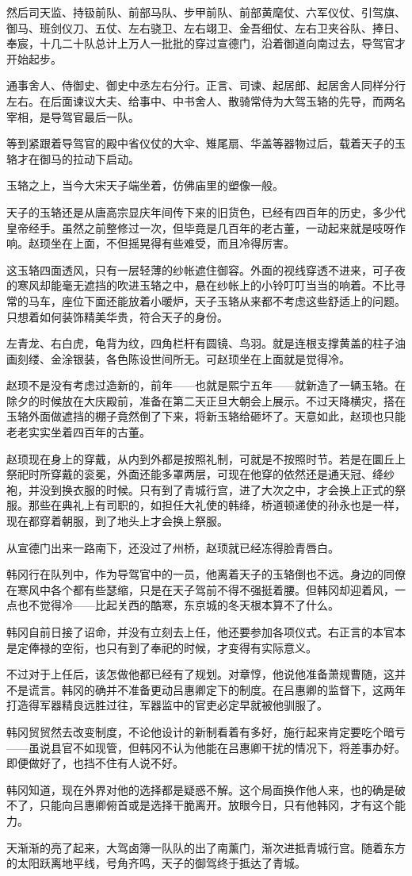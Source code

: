 然后司天监、持钑前队、前部马队、步甲前队、前部黄麾仗、六军仪仗、引驾旗、御马、班剑仪刀、五仗、左右骁卫、左右翊卫、金吾细仗、左右卫夹谷队、捧日、奉宸，十几二十队总计上万人一批批的穿过宣德门，沿着御道向南过去，导驾官才开始起步。

通事舍人、侍御史、御史中丞左右分行。正言、司谏、起居郎、起居舍人同样分行左右。在后面谏议大夫、给事中、中书舍人、散骑常侍为大驾玉辂的先导，而两名宰相，是导驾官最后一队。

等到紧跟着导驾官的殿中省仪仗的大伞、雉尾扇、华盖等器物过后，载着天子的玉辂才在御马的拉动下启动。

玉辂之上，当今大宋天子端坐着，仿佛庙里的塑像一般。

天子的玉辂还是从唐高宗显庆年间传下来的旧货色，已经有四百年的历史，多少代皇帝经手。虽然之前整修过一次，但毕竟是几百年的老古董，一动起来就是吱呀作响。赵顼坐在上面，不但摇晃得有些难受，而且冷得厉害。

这玉辂四面透风，只有一层轻薄的纱帐遮住御容。外面的视线穿透不进来，可子夜的寒风却能毫无遮挡的吹进玉辂之中，悬在纱帐上的小铃叮叮当当的响着。不比寻常的马车，座位下面还能放着小暖炉，天子玉辂从来都不考虑这些舒适上的问题。只想着如何装饰精美华贵，符合天子的身份。

左青龙、右白虎，龟背为纹，四角栏杆有圆镜、鸟羽。就是连根支撑黄盖的柱子油画刻缕、金涂银装，各色陈设世间所无。可赵顼坐在上面就是觉得冷。

赵顼不是没有考虑过造新的，前年——也就是熙宁五年——就新造了一辆玉辂。在除夕的时候放在大庆殿前，准备在第二天正旦大朝会上展示。不过天降横灾，搭在玉辂外面做遮挡的棚子竟然倒了下来，将新玉辂给砸坏了。天意如此，赵顼也只能老老实实坐着四百年的古董。

赵顼现在身上的穿戴，从内到外都是按照礼制，可就是不按照时节。若是在圜丘上祭祀时所穿戴的衮冕，外面还能多罩两层，可现在他穿的依然还是通天冠、绛纱袍，并没到换衣服的时候。只有到了青城行宫，进了大次之中，才会换上正式的祭服。那些在典礼上有司职的，如担任大礼使的韩绛，桥道顿递使的孙永也是一样，现在都穿着朝服，到了地头上才会换上祭服。

从宣德门出来一路南下，还没过了州桥，赵顼就已经冻得脸青唇白。

韩冈行在队列中，作为导驾官中的一员，他离着天子的玉辂倒也不远。身边的同僚在寒风中各个都有些瑟缩，只是在天子驾前不得不强挺着腰。但韩冈却迎着风，一点也不觉得冷——比起关西的酷寒，东京城的冬天根本算不了什么。

韩冈自前日接了诏命，并没有立刻去上任，他还要参加各项仪式。右正言的本官本是定俸禄的空衔，也只有到了奉祀的时候，才变得有实际意义。

不过对于上任后，该怎做他都已经有了规划。对章惇，他说他准备萧规曹随，这并不是谎言。韩冈的确并不准备更动吕惠卿定下的制度。在吕惠卿的监督下，这两年打造得军器精良远胜过往，军器监中的官吏必定早就被他驯服了。

韩冈贸贸然去改变制度，不论他设计的新制看着有多好，施行起来肯定要吃个暗亏——虽说县官不如现管，但韩冈不认为他能在吕惠卿干扰的情况下，将差事办好。即便做好了，也挡不住有人说不好。

韩冈知道，现在外界对他的选择都是疑惑不解。这个局面换作他人来，也的确是破不了，只能向吕惠卿俯首或是选择干脆离开。放眼今日，只有他韩冈，才有这个能力。

天渐渐的亮了起来，大驾卤簿一队队的出了南薰门，渐次进抵青城行宫。随着东方的太阳跃离地平线，号角齐鸣，天子的御驾终于抵达了青城。

